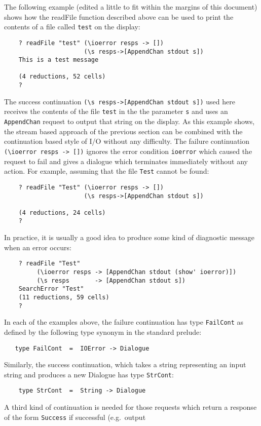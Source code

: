 The following example (edited a little to fit within the margins of this
document) shows how the readFile function described above can be used to
print the contents of a file called \verb"test" on the display:
\begin{verbatim}
    ? readFile "test" (\ioerror resps -> [])
                      (\s resps->[AppendChan stdout s])
    This is a test message

    (4 reductions, 52 cells)
    ?
\end{verbatim}
The success continuation \verb"(\s resps->[AppendChan stdout s])" used  here
receives the contents of the file \verb"test" in the the parameter \verb"s" and
uses an \verb"AppendChan" request to output that string on  the  display.   As
this example shows, the stream based approach of the  previous  section
can be combined with the continuation based style of  I/O  without  any
difficulty.  The failure continuation \verb"(\ioerror resps -> [])"  ignores
the error condition \verb"ioerror" which caused  the  request  to  fail  and
gives a dialogue which terminates immediately without any action.  For
example, assuming that the file \verb"Test" cannot be found:
\begin{verbatim}
    ? readFile "Test" (\ioerror resps -> [])
                      (\s resps->[AppendChan stdout s])

    (4 reductions, 24 cells)
    ?
\end{verbatim}
In practice, it is  usually  a  good  idea  to  produce  some  kind  of
diagnostic message when an error occurs:
\begin{verbatim}
    ? readFile "Test"
         (\ioerror resps -> [AppendChan stdout (show' ioerror)])
         (\s resps       -> [AppendChan stdout s])
    SearchError "Test"
    (11 reductions, 59 cells)
    ?
\end{verbatim}
In each of the  examples  above,  the  failure  continuation  has  type
\verb"FailCont" as defined by the following type  synonym  in  the  standard
prelude:
\begin{verbatim}
   type FailCont  =  IOError -> Dialogue
\end{verbatim}
Similarly, the success continuation, which takes a string  representing
an input string and produces a new Dialogue has type \verb"StrCont":
\begin{verbatim}
    type StrCont  =  String -> Dialogue
\end{verbatim}
A third kind of continuation is needed for those requests which  return
a  response  of  the  form  \verb"Success"  if  successful   (e.g.\    output
